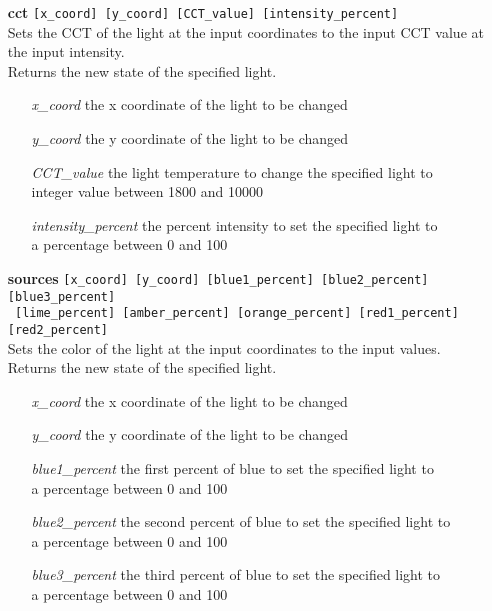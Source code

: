 \documentclass[twoside]{article}
\begin{document}
	\begin{enumerate}
		\item[\bf cct] \verb|[x_coord] [y_coord] [CCT_value] [intensity_percent]|\\
		Sets the CCT of the light at the input coordinates to the input CCT value at the input intensity.\\
		Returns the new state of the specified light.
		
		\begin{enumerate}[leftmargin=3\parindent]
			\item[{\it x\_coord}] the x coordinate of the light to be changed
			\item[{\it y\_coord}] the y coordinate of the light to be changed
			\item[{\it CCT\_value}] the light temperature to change the specified light to\\
			integer value between 1800 and 10000
			\item[{\it intensity\_percent}] the percent intensity to set the specified light to\\
			a percentage between 0 and 100
		\end{enumerate}
		
		\item[\bf sources] \verb|[x_coord] [y_coord] [blue1_percent] [blue2_percent] [blue3_percent]|\\
						 \verb| [lime_percent] [amber_percent] [orange_percent] [red1_percent] [red2_percent]|\\
		Sets the color of the light at the input coordinates to the input values.\\
		Returns the new state of the specified light.
		
		\begin{enumerate}[leftmargin=3\parindent]
			\item[{\it x\_coord}] the x coordinate of the light to be changed
			\item[{\it y\_coord}] the y coordinate of the light to be changed
			
			\item[{\it blue1\_percent}] the first percent of blue to set the specified light to\\
			a percentage between 0 and 100
			\item[{\it blue2\_percent}] the second percent of blue to set the specified light to\\
			a percentage between 0 and 100
			\item[{\it blue3\_percent}] the third percent of blue to set the specified light to\\
			a percentage between 0 and 100
			

\end{enumerate}
\end{enumerate}
\end{document}
